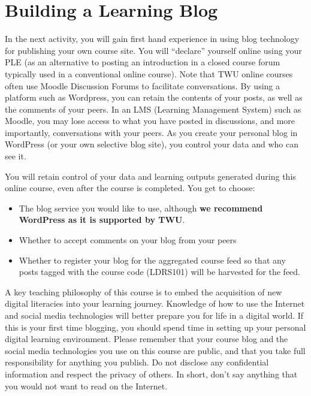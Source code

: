 \documentclass[
]{book}
\providecommand{\tightlist}{%
  \setlength{\itemsep}{0pt}\setlength{\parskip}{0pt}}
\theoremstyle{definition}
\theoremstyle{definition}
\theoremstyle{definition}
\theoremstyle{definition}
\theoremstyle{remark}
\begin{document}
\hypertarget{building-a-learning-blog}{%
\section{Building a Learning Blog}\label{building-a-learning-blog}}

In the next activity, you will gain first hand experience in using blog technology for publishing your own course site. You will ``declare'' yourself online using your PLE (as an alternative to posting an introduction in a closed course forum typically used in a conventional online course). Note that TWU online courses often use Moodle Discussion Forums to facilitate conversations. By using a platform such as Wordpress, you can retain the contents of your posts, as well as the comments of your peers. In an LMS (Learning Management System) such as Moodle, you may lose access to what you have posted in discussions, and more importantly, conversations with your peers. As you create your personal blog in WordPress (or your own selective blog site), you control your data and who can see it.

You will retain control of your data and learning outputs generated during this online course, even after the course is completed.
You get to choose:

\begin{itemize}
\tightlist
\item
  The blog service you would like to use, although \textbf{we recommend WordPress as it is supported by TWU}.
\item
  Whether to accept comments on your blog from your peers
\item
  Whether to register your blog for the aggregated course feed so that any posts tagged with the course code (LDRS101) will be harvested for the feed.
\end{itemize}

A key teaching philosophy of this course is to embed the acquisition of new digital literacies into your learning journey. Knowledge of how to use the Internet and social media technologies will better prepare you for life in a digital world. If this is your first time blogging, you should spend time in setting up your personal digital learning environment. Please remember that your course blog and the social media technologies you use on this course are public, and that you take full responsibility for anything you publish. Do not disclose any confidential information and respect the privacy of others. In short, don't say anything that you would not want to read on the Internet.
\end{document}
